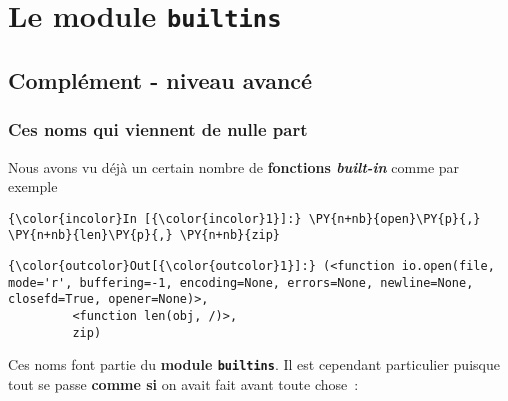     
    
    
    

    

    \hypertarget{le-module-builtins}{%
\section{\texorpdfstring{Le module
\texttt{builtins}}{Le module builtins}}\label{le-module-builtins}}

    \hypertarget{compluxe9ment---niveau-avancuxe9}{%
\subsection{Complément - niveau
avancé}\label{compluxe9ment---niveau-avancuxe9}}

    \hypertarget{ces-noms-qui-viennent-de-nulle-part}{%
\subsubsection{Ces noms qui viennent de nulle
part}\label{ces-noms-qui-viennent-de-nulle-part}}

    Nous avons vu déjà un certain nombre de \textbf{fonctions
\emph{built-in}} comme par exemple

    \begin{Verbatim}[commandchars=\\\{\},frame=single,framerule=0.3mm,rulecolor=\color{cellframecolor}]
{\color{incolor}In [{\color{incolor}1}]:} \PY{n+nb}{open}\PY{p}{,} \PY{n+nb}{len}\PY{p}{,} \PY{n+nb}{zip}
\end{Verbatim}


\begin{Verbatim}[commandchars=\\\{\},frame=single,framerule=0.3mm,rulecolor=\color{cellframecolor}]
{\color{outcolor}Out[{\color{outcolor}1}]:} (<function io.open(file, mode='r', buffering=-1, encoding=None, errors=None, newline=None, closefd=True, opener=None)>,
         <function len(obj, /)>,
         zip)
\end{Verbatim}
            
    Ces noms font partie du \textbf{module \texttt{builtins}}. Il est
cependant particulier puisque tout se passe \textbf{comme si} on avait
fait avant toute chose~:

\begin{Shaded}
\begin{Highlighting}[frame=lines,framerule=0.6mm,rulecolor=\color{asisframecolor}]
 \OperatorTok{*}
\end{Highlighting}
\end{Shaded}

